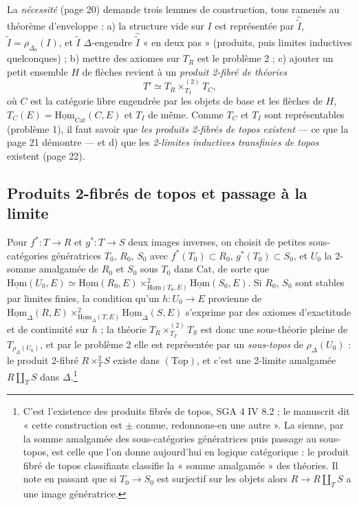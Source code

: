 \documentclass[11pt,a4paper]{article}
\begin{document}
La \emph{nécessité} (page 20) demande trois lemmes de construction, tous
ramenés au théorème d'enveloppe : a) la structure vide sur $I$ est
représentée par $\widehat{\widetilde{I}}$, $\widetilde{I} = \rho_{\Delta_{0}}
(I)$, et $\widetilde{I}$ $\Delta$-engendre $\widehat{\widetilde{I}}$ « en
deux pas » (produits, puis limites inductives quelconques) ; b) mettre des
axiomes sur $T_{R}$ est le problème 2 ; c) ajouter un petit ensemble $H$ de
flèches revient à un \emph{produit 2-fibré de théories}
\[
T' \simeq T_{R} \times^{(2)}_{T_{I}} T_{C},
\]
où $C$ est la catégorie libre engendrée par les objets de base et les
flèches de $H$, $T_{C}(E) = \underline{\mathrm{Hom}}_{\mathrm{Cat}}(C, E)$ et
$T_{I}$ de même. Comme $T_{C}$ et $T_{I}$ sont représentables (problème
1), il faut savoir que \emph{les produits 2-fibrés de topos existent} —
ce que la page 21 démontre — et d) que les \emph{2-limites inductives
transfinies de topos} existent (page 22).

\subsection*{Produits 2-fibrés de topos et passage à la limite}

Pour $f^{*} : T \to R$ et $g^{*} : T \to S$ deux images inverses, on
choisit de petites sous-catégories génératrices $T_{0}$, $R_{0}$, $S_{0}$
avec $f^{*}(T_{0}) \subset R_{0}$, $g^{*}(T_{0}) \subset S_{0}$, et $U_{0}$ la
2-somme amalgamée de $R_{0}$ et $S_{0}$ sous $T_{0}$ dans $\mathrm{Cat}$, de
sorte que $\underline{\mathrm{Hom}}(U_{0}, E) \simeq \underline{\mathrm{Hom}}
(R_{0}, E) \times^{2}_{\underline{\mathrm{Hom}}(T_{0}, E)}
\underline{\mathrm{Hom}}(S_{0}, E)$. Si $R_{0}$, $S_{0}$ sont stables par
limites finies, la condition qu'un $h : U_{0} \to E$ provienne de
$\underline{\mathrm{Hom}}_{\Delta}(R, E) \times^{2}_{\underline{\mathrm{Hom}}
_{\Delta}(T,E)} \underline{\mathrm{Hom}}_{\Delta}(S, E)$ s'exprime par des
axiomes d'exactitude et de continuité sur $h$ ; la théorie $T_{R}
\times^{(2)}_{T_{T}} T_{S}$ est donc une sous-théorie pleine de
$T_{\rho_{\Delta}(U_{0})}$, et par le problème 2 elle est représentée par
un \emph{sous-topos} de $\rho_{\Delta}(U_{0})$ : le produit 2-fibré
$R \times^{2}_{T} S$ existe dans $(\mathrm{Top})$, et c'est une 2-limite
amalgamée $R \amalg_{T} S$ dans $\Delta$.\footnote{C'est l'existence des
produits fibrés de topos, SGA 4 IV 8.2 ; le manuscrit dit « cette
construction est $\pm$ connue, redonnons-en une autre ». La sienne, par la
somme amalgamée des sous-catégories génératrices puis passage au
sous-topos, est celle que l'on donne aujourd'hui en logique catégorique :
le produit fibré de topos classifiants classifie la « somme amalgamée » des
théories. Il note en passant que si $T_{0} \to S_{0}$ est surjectif sur les
objets alors $R \to R \amalg_{T} S$ a une image génératrice.}
\end{document}
